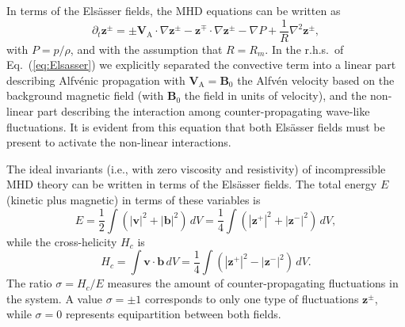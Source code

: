 \documentclass[aip,pop,reprint,amsmath,amssymb,floatfix]{revtex4-1}
\renewcommand{\vec}[1]{\mathbf{#1}}
\begin{document}
In terms of the Els\"asser fields, the MHD equations can be written 
\cite{servidio_time_2011} as
\begin{equation}
\partial_t \vec{z}^\pm  = \pm  \vec{V}_\textrm{A} \cdot \nabla \vec{z}^\pm  - 
\vec{z}^\mp \cdot \nabla \vec{z}^\pm - \nabla{P} + 
\frac{1}{R} \nabla^2 \vec{z}^\pm ,
\label{eq:Elsasser}
\end{equation}
with $P=p/\rho$, and with the assumption that $R=R_m$. In the r.h.s.~of Eq.~(\ref{eq:Elsasser}) we explicitly separated the convective term into a linear part describing Alfv\'enic propagation with $\vec{V}_\textrm{A} = \vec{B}_0$ the Alfv\'en velocity based on the background magnetic field (with $\vec{B}_0$ the field in units of velocity), and the non-linear part describing the interaction among counter-propagating wave-like fluctuations. It is evident from this equation that both Els\"asser fields must be present to activate the non-linear interactions.

The ideal invariants (i.e., with zero viscosity and resistivity) of  incompressible MHD theory can be written in terms of the Els\"asser fields. The total energy $E$ (kinetic plus magnetic) in terms of these variables is
\begin{equation}
E = \frac{1}{2}\int{\left(\left|\vec{v}\right|^2 +
    \left|\vec{b}\right|^2 \right)\,dV} =
    \frac{1}{4}\int{\left(\left|\vec{z}^+\right|^2 +
    \left|\vec{z}^-\right|^2 \right)\,dV},
\label{eq:ener}
\end{equation}
while the cross-helicity $H_c$ is
\begin{equation}
H_c = \int{\vec{v}\cdot\vec{b} \, dV} =
    \frac{1}{4}\int{\left(\left|\vec{z}^+\right|^2 
    - \left|\vec{z}^-\right|^2 \right)\,dV} .
\label{eq:cross}
\end{equation}
The ratio $\sigma = H_c/E$ measures the amount of counter-propagating fluctuations in the system. A value $\sigma = \pm 1$ corresponds to only one type of fluctuations $\vec{z}^\pm$, while $\sigma=0$ represents equipartition between both fields. 
\end{document}
